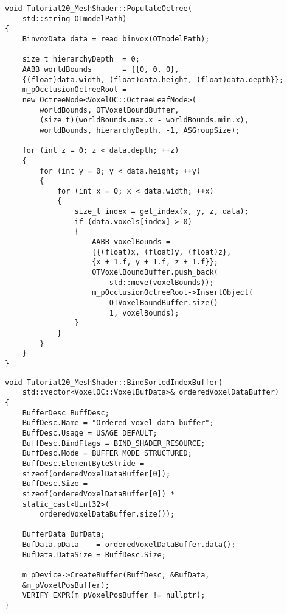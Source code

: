\begin{lstlisting}
void Tutorial20_MeshShader::PopulateOctree(
    std::string OTmodelPath)
{
    BinvoxData data = read_binvox(OTmodelPath);

    size_t hierarchyDepth  = 0;
    AABB worldBounds       = {{0, 0, 0}, 
    {(float)data.width, (float)data.height, (float)data.depth}};
    m_pOcclusionOctreeRoot = 
    new OctreeNode<VoxelOC::OctreeLeafNode>(
        worldBounds, OTVoxelBoundBuffer, 
        (size_t)(worldBounds.max.x - worldBounds.min.x), 
        worldBounds, hierarchyDepth, -1, ASGroupSize);

    for (int z = 0; z < data.depth; ++z)
    {
        for (int y = 0; y < data.height; ++y)
        {
            for (int x = 0; x < data.width; ++x)
            {
                size_t index = get_index(x, y, z, data);
                if (data.voxels[index] > 0)
                {
                    AABB voxelBounds = 
                    {{(float)x, (float)y, (float)z}, 
                    {x + 1.f, y + 1.f, z + 1.f}};
                    OTVoxelBoundBuffer.push_back(
                        std::move(voxelBounds));
                    m_pOcclusionOctreeRoot->InsertObject(
                        OTVoxelBoundBuffer.size() - 
                        1, voxelBounds);
                }
            }
        }
    }
}
\end{lstlisting}

\begin{lstlisting}
void Tutorial20_MeshShader::BindSortedIndexBuffer(
    std::vector<VoxelOC::VoxelBufData>& orderedVoxelDataBuffer)
{
    BufferDesc BuffDesc;
    BuffDesc.Name = "Ordered voxel data buffer";
    BuffDesc.Usage = USAGE_DEFAULT;
    BuffDesc.BindFlags = BIND_SHADER_RESOURCE;
    BuffDesc.Mode = BUFFER_MODE_STRUCTURED;
    BuffDesc.ElementByteStride = 
    sizeof(orderedVoxelDataBuffer[0]);
    BuffDesc.Size = 
    sizeof(orderedVoxelDataBuffer[0]) * 
    static_cast<Uint32>(
        orderedVoxelDataBuffer.size());

    BufferData BufData;
    BufData.pData    = orderedVoxelDataBuffer.data();
    BufData.DataSize = BuffDesc.Size;

    m_pDevice->CreateBuffer(BuffDesc, &BufData, 
    &m_pVoxelPosBuffer);
    VERIFY_EXPR(m_pVoxelPosBuffer != nullptr);
}
\end{lstlisting}

